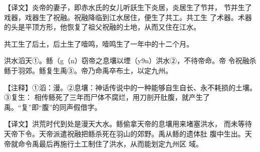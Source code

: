 \documentclass[a4paper,12pt,UTF8,twoside]{ctexbook}
\begin{document}
【译文】炎帝的妻子，即赤水氏的女儿听訞生下炎居，炎居生了节并， 节并生了戏器，戏器生了祝融。祝融降临到江水居住，便生了共工。共工生 了术器。术器的头是平顶方形，他恢复了祖父祝融的土地，从而又住在江水。

共工生了后土，后土生了噎鸣，噎鸣生了一年中的十二个月。

洪水滔天①。鲧（g（n）窃帝之息壤以堙（y9n）洪水②，不待帝命。帝 令祝融杀鲧于羽郊。鲧复生禹③。帝乃命禹卒布土，以定九州。

【注释】①滔：漫。②息壤：神话传说中的一种能够自生自长、永不耗损的土壤。③复生： 相传鲧死了三年而尸体不腐烂，用刀剖开肚腹，就产生了禹。“复”即“腹”的同声假借字。

【译文】洪荒时代到处是漫天大水。鲧偷拿天帝的息壤用来堵塞洪水， 而未等待天帝下令。天帝派遣祝融把鲧杀死在羽山的郊野。禹从鲧的遗体肚 腹中生出。天帝就命令禹最后再施行土工制住了洪水，从而能划定九州区 域。







\backmatter
\end{document}
